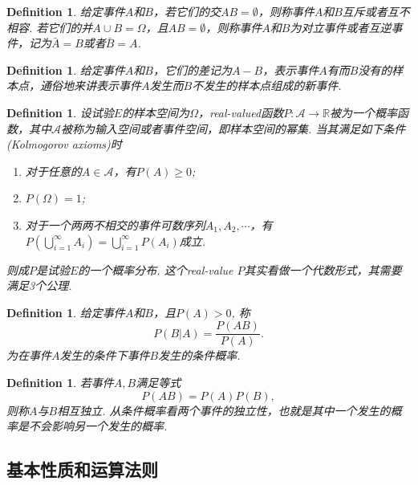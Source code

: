 \documentclass{article}
\newtheorem{definition}[theorem]{Definition}
\newcommand*{\xfunc}[4]{{#2}\colon{#3}{#1}{#4}}
\newcommand*{\func}[3]{\xfunc{\to}{#1}{#2}{#3}}
\begin{document}
\begin{definition}
\rm 给定事件$A$和$B$，若它们的交$AB = \emptyset$，则称事件$A$和$B${\color{red}互斥}或者{\color{red}互不相容}. 若它们的并$A\cup B = \Omega$，且$AB=\emptyset$，则称事件$A$和$B$为{\color{red}对立事件}或者{\color{red}互逆事件}，记为$\bar{A} = B$或者$\bar{B} = A$.
\end{definition}

\begin{definition}
\rm 给定事件$A$和$B$，它们的差记为$A-B$，表示事件$A$有而$B$没有的样本点，通俗地来讲表示事件$A$发生而$B$不发生的样本点组成的新事件.
\end{definition}

\begin{definition}
\rm 设试验$E$的样本空间为$\Omega$，real-valued函数$\func{P}{\mathcal{A}}{\mathbb{R}}$被为一个概率函数，其中$\mathcal{A}$被称为{\color{red}输入空间}或者{\color{red}事件空间}，即样本空间的{\color{red}幂集}. 当其满足如下条件(Kolmogorov axioms)时
\begin{enumerate}
	\item 对于任意的$A \in \mathcal{A}$，有$P(A) \geq 0$;
	\item $P(\Omega) = 1$;
	\item 对于一个两两不相交的事件可数序列$A_1,A_2,\cdots$，有$P(\bigcup\limits_{i=1}^{\infty} A_i) = \bigcup\limits_{i=1}^{\infty}P(A_i)$成立.
\end{enumerate}
则成$P$是试验$E$的一个{\color{red}概率分布}. {\color{blue} 这个real-value $P$其实看做一个代数形式，其需要满足3个公理.}
\end{definition}

\begin{definition}
\rm 给定事件$A$和$B$，且$P(A) > 0$, 称
$$
P(B|A) = \frac{P(AB)}{P(A)}.
$$
为在事件$A$发生的条件下事件$B$发生的{\color{red}条件概率}.
\end{definition}

\begin{definition}
\rm 若事件$A,B$满足等式
$$
P(AB) = P(A)P(B),
$$
则称$A$与$B${\color{red}相互独立}. {\color{blue} 从条件概率看两个事件的独立性，也就是其中一个发生的概率是不会影响另一个发生的概率}.
\end{definition}

\newpage
\subsection{基本性质和运算法则}
\end{document}
